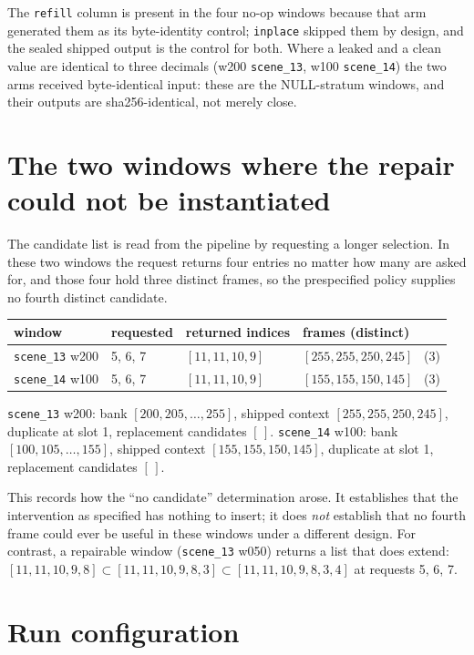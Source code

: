 \documentclass[11pt,a4paper]{article}
\newcommand{\code}[1]{\texttt{\small #1}}
\begin{document}
The \code{refill} column is present in the four no-op windows because that arm generated them as its
byte-identity control; \code{inplace} skipped them by design, and the sealed shipped output is the
control for both. Where a leaked and a clean value are identical to three decimals (w200
\code{scene\_13}, w100 \code{scene\_14}) the two arms received byte-identical input: these are the
NULL-stratum windows, and their outputs are sha256-identical, not merely close.

\section{The two windows where the repair could not be instantiated}
\label{app:excluded}

The candidate list is read from the pipeline by requesting a longer selection. In these two windows
the request returns four entries no matter how many are asked for, and those four hold three distinct
frames, so the prespecified policy supplies no fourth distinct candidate.

\begin{center}\small
\begin{tabular}{@{}llll@{}}
\toprule
window & requested & returned indices & frames (distinct) \\
\midrule
\code{scene\_13} w200 & 5, 6, 7 & $[11,11,10,9]$ & $[255,255,250,245]$ \ (3) \\
\code{scene\_14} w100 & 5, 6, 7 & $[11,11,10,9]$ & $[155,155,150,145]$ \ (3) \\
\bottomrule
\end{tabular}
\end{center}

\code{scene\_13} w200: bank $[200,205,\dots,255]$, shipped context $[255,255,250,245]$, duplicate at
slot 1, replacement candidates $[\,]$. \code{scene\_14} w100: bank $[100,105,\dots,155]$, shipped
context $[155,155,150,145]$, duplicate at slot 1, replacement candidates $[\,]$.

This records how the ``no candidate'' determination arose. It establishes that the intervention as
specified has nothing to insert; it does \emph{not} establish that no fourth frame could ever be
useful in these windows under a different design. For contrast, a repairable window
(\code{scene\_13} w050) returns a list that does extend:
$[11,11,10,9,8] \subset [11,11,10,9,8,3] \subset [11,11,10,9,8,3,4]$ at requests 5, 6, 7.

\section{Run configuration}
\label{app:config}
\end{document}
